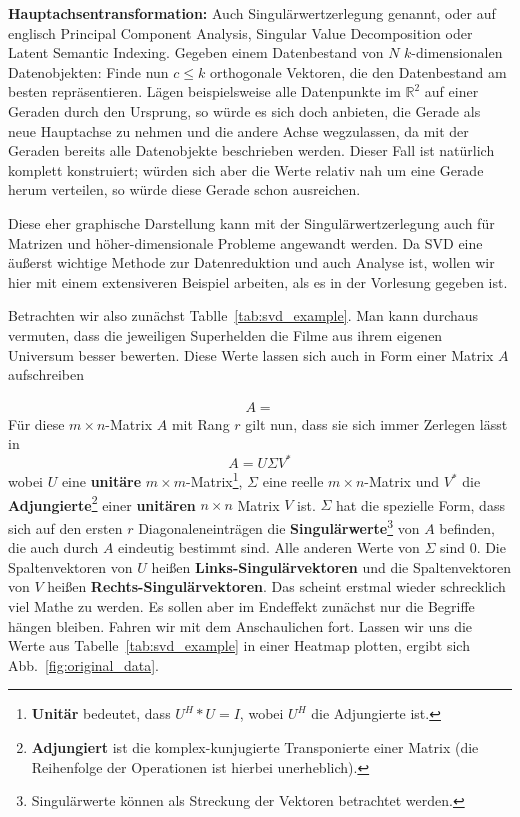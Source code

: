 \textbf{Hauptachsentransformation:} Auch Singulärwertzerlegung genannt, oder auf 
englisch Principal Component Analysis, Singular Value Decomposition oder Latent 
Semantic Indexing. Gegeben einem Datenbestand von \(N\) \(k\)-dimensionalen 
Datenobjekten: Finde nun \(c\leq k\) orthogonale Vektoren, die den Datenbestand
am besten repräsentieren. Lägen beispielsweise alle Datenpunkte im \(\mathbb{R}^2\)
auf einer Geraden durch den Ursprung, so würde es sich doch anbieten, die Gerade
als neue Hauptachse zu nehmen und die andere Achse wegzulassen, da mit der Geraden
bereits alle Datenobjekte beschrieben werden. Dieser Fall ist natürlich komplett
konstruiert; würden sich aber die Werte relativ nah um eine Gerade herum verteilen,
so würde diese Gerade schon ausreichen.

Diese eher graphische Darstellung kann mit der Singulärwertzerlegung auch für
Matrizen und höher-dimensionale Probleme angewandt werden. Da SVD eine äußerst
wichtige Methode zur Datenreduktion und auch Analyse ist, wollen wir hier mit 
einem extensiveren Beispiel arbeiten, als es in der Vorlesung gegeben ist.



Betrachten wir also zunächst Tablle~\ref{tab:svd_example}. Man kann durchaus vermuten,
dass die jeweiligen Superhelden die Filme aus ihrem eigenen Universum besser bewerten.
Diese Werte lassen sich auch in Form einer Matrix \(A\) aufschreiben

\begin{align*}
	A = 
\end{align*}
Für diese \(m\times n\)-Matrix \(A\) mit Rang \(r\) gilt nun, dass sie sich immer 
Zerlegen lässt in
\[
	A = U\Sigma V^*
\]
wobei \(U\) eine \textbf{unitäre} \(m\times m\)-Matrix\footnote{\textbf{Unitär} bedeutet,
dass \(U^{H}*U = I\), wobei \(U^{H}\) die Adjungierte ist.}, \(\Sigma\) eine 
reelle \(m\times n\)-Matrix und \(V^*\) die \textbf{Adjungierte}\footnote{
\textbf{Adjungiert} ist die komplex-kunjugierte Transponierte einer Matrix (die Reihenfolge der
Operationen ist hierbei unerheblich).} einer
\textbf{unitären} \(n\times n\) Matrix \(V\) ist. \(\Sigma\) hat die spezielle Form, dass
sich auf den ersten \(r\) Diagonaleneinträgen die \textbf{Singulärwerte}\footnote{Singulärwerte
können als Streckung der Vektoren betrachtet werden.} von \(A\)
befinden, die auch durch \(A\) eindeutig bestimmt sind. Alle anderen Werte von
\(\Sigma\) sind \(0\). Die Spaltenvektoren von \(U\) heißen \textbf{Links-Singulärvektoren}
und die Spaltenvektoren von \(V\) heißen \textbf{Rechts-Singulärvektoren}.
Das scheint erstmal wieder schrecklich viel Mathe zu werden. Es sollen aber im
Endeffekt zunächst nur die Begriffe hängen bleiben. Fahren wir mit dem Anschaulichen
fort. Lassen wir uns die Werte aus Tabelle~\ref{tab:svd_example} in einer Heatmap
plotten, ergibt sich Abb.~\ref{fig:original_data}.

